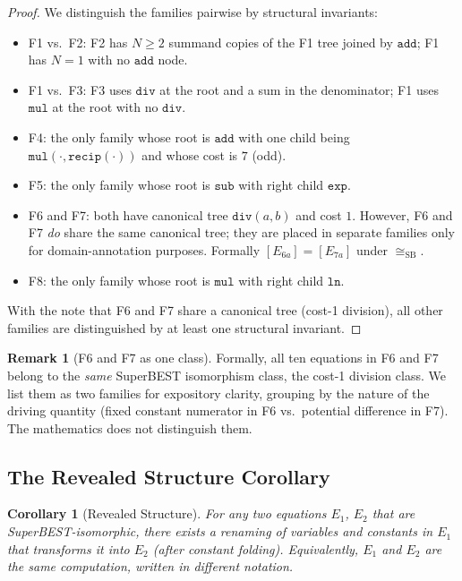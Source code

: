 \documentclass[12pt,a4paper]{article}
\newtheorem{corollary}[theorem]{Corollary}
\theoremstyle{definition}
\newtheorem{remark}[theorem]{Remark}
\newcommand{\mexp}{\mathtt{exp}}
\newcommand{\mmul}{\mathtt{mul}}
\newcommand{\mdiv}{\mathtt{div}}
\newcommand{\madd}{\mathtt{add}}
\newcommand{\msub}{\mathtt{sub}}
\newcommand{\mln}{\mathtt{ln}}
\newcommand{\mrecip}{\mathtt{recip}}
\newcommand{\siso}{\cong_{\mathrm{SB}}}
\begin{document}
\begin{proof}
We distinguish the families pairwise by structural invariants:
\begin{itemize}
  \item F1 vs.\ F2: F2 has $N \geq 2$ summand copies of the F1 tree joined by
        $\madd$; F1 has $N = 1$ with no $\madd$ node.
  \item F1 vs.\ F3: F3 uses $\mdiv$ at the root and a sum in the denominator;
        F1 uses $\mmul$ at the root with no $\mdiv$.
  \item F4: the only family whose root is $\madd$ with one child being
        $\mmul(\cdot, \mrecip(\cdot))$ and whose cost is $7$ (odd).
  \item F5: the only family whose root is $\msub$ with right child $\mexp$.
  \item F6 and F7: both have canonical tree $\mdiv(a,b)$ and cost $1$.
        However, F6 and F7 \emph{do} share the same canonical tree; they are
        placed in separate families only for domain-annotation purposes.
        Formally $[E_{6a}] = [E_{7a}]$ under $\siso$.
  \item F8: the only family whose root is $\mmul$ with right child $\mln$.
\end{itemize}
With the note that F6 and F7 share a canonical tree (cost-1 division), all
other families are distinguished by at least one structural invariant.
\end{proof}

\begin{remark}[F6 and F7 as one class]
Formally, all ten equations in F6 and F7 belong to the \emph{same}
SuperBEST isomorphism class, the cost-1 division class.  We list them as
two families for expository clarity, grouping by the nature of the driving
quantity (fixed constant numerator in F6 vs.\ potential difference in F7).
The mathematics does not distinguish them.
\end{remark}

\subsection{The Revealed Structure Corollary}

\begin{corollary}[Revealed Structure]
\label{cor:revealed}
For any two equations $E_1$, $E_2$ that are SuperBEST-isomorphic, there exists
a renaming of variables and constants in $E_1$ that transforms it into $E_2$
(after constant folding).  Equivalently, $E_1$ and $E_2$ are the same
computation, written in different notation.
\end{corollary}
\end{document}

